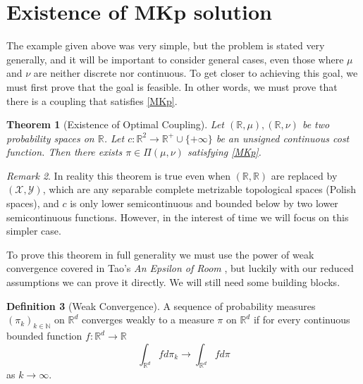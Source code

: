 \documentclass[11pt]{amsart}
\newtheorem{theorem}{Theorem}[section]      %
\theoremstyle{definition}                  %
\newtheorem{definition}[theorem]{Definition}
\theoremstyle{remark}                      %
\newtheorem{remark}[theorem]{Remark}
\begin{document}
\section{Existence of MKp solution}
The example given above was very simple, but the problem is stated very generally, and it will 
be important to consider general cases, even those where $\mu$ and $\nu$ are neither discrete nor continuous.
To get closer to achieving this goal, we must first prove that the goal is feasible. In other words, we must prove
that there is a coupling that satisfies \eqref{MKp}.




\begin{theorem}[Existence of Optimal Coupling]\label{thm:Existence}
    Let $( \mathbb{R},\mu), ( \mathbb{R},\nu)$ be two probability spaces on $ \mathbb{R}$. Let $c : \mathbb{R}^2 \rightarrow \mathbb{R}^{+} \cup \{+\infty\} $ be an unsigned continuous cost function.
    Then there exists $\pi \in \Pi(\mu,\nu)$ satisfying \eqref{MKp}.
\end{theorem}

\begin{remark}
    In reality this theorem is true even when $ (\mathbb{R}, \mathbb{R})$ are replaced by $(\mathcal{X}, \mathcal{Y})$, which are any separable complete metrizable topological spaces (Polish spaces), and $c$ is only lower semicontinuous and bounded below
    by two lower semicontinuous functions. However, in the interest of time we will focus on this simpler case.
\end{remark}

To prove this theorem in full generality we must use the power of weak convergence covered in Tao's \emph{An Epsilon of Room} \citep{tao2010epsilon}, but luckily with our reduced assumptions we can prove it directly. We will still need
some building blocks.

\begin{definition}[Weak Convergence]
    A sequence of probability measures $(\pi_k)_{k \in \mathbb{N}}$ on $ \mathbb{R}^{d}$ converges weakly to a
    measure $\pi$ on $ \mathbb{R}^{d}$ if for every continuous bounded function $f: \mathbb{R}^d \rightarrow \mathbb{R}$
    \[
    \int_{ \mathbb{R}^d}^{}fd\pi_k \rightarrow \int_{ \mathbb{R}^d}^{}f d\pi
    \] 
    as $k \rightarrow \infty$.
\end{definition}
\end{document}
